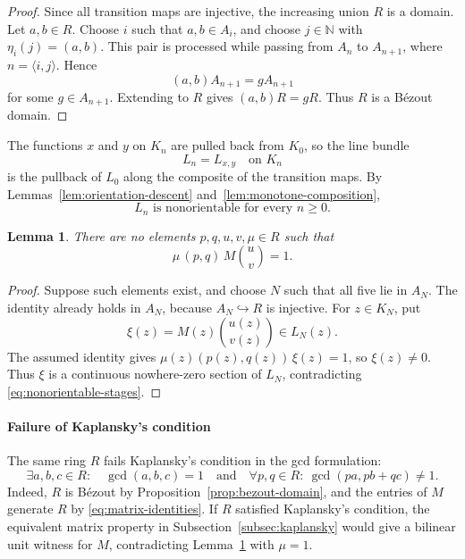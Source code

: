 \documentclass[11pt]{amsart}
\numberwithin{equation}{section}
\newtheorem{lemma}[theorem]{Lemma}
\theoremstyle{definition}
\newcommand{\N}{\mathbb{N}}
\begin{document}
\begin{proof}
Since all transition maps are injective, the increasing union $R$ is a domain. Let $a,b\in R$. Choose $i$ such that $a,b\in A_i$, and choose $j\in\N$ with $\eta_i(j)=(a,b)$. This pair is processed while passing from $A_n$ to $A_{n+1}$, where $n=\langle i,j\rangle$. Hence
\[
  (a,b)A_{n+1}=gA_{n+1}
\]
for some $g\in A_{n+1}$. Extending to $R$ gives $(a,b)R=gR$. Thus $R$ is a B\'ezout domain.
\end{proof}

The functions $x$ and $y$ on $K_n$ are pulled back from $K_0$, so the line bundle
\[
  L_n=L_{x,y}\quad\text{on }K_n
\]
is the pullback of $L_0$ along the composite of the transition maps. By Lemmas~\ref{lem:orientation-descent} and~\ref{lem:monotone-composition},
\begin{equation}\label{eq:nonorientable-stages}
  L_n\text{ is nonorientable for every }n\ge0.
\end{equation}

\begin{lemma}\label{lem:key-obstruction}
There are no elements $p,q,u,v,\mu\in R$ such that
\[
  \mu\,(p,q)\,M\binom uv=1.
\]
\end{lemma}

\begin{proof}
Suppose such elements exist, and choose $N$ such that all five lie in $A_N$. The identity already holds in $A_N$, because $A_N\hookrightarrow R$ is injective. For $z\in K_N$, put
\[
  \xi(z)=M(z)\binom{u(z)}{v(z)}\in L_N(z).
\]
The assumed identity gives $\mu(z)(p(z),q(z))\,\xi(z)=1$, so $\xi(z)\ne0$. Thus $\xi$ is a continuous nowhere-zero section of $L_N$, contradicting \eqref{eq:nonorientable-stages}.
\end{proof}

\paragraph{Failure of Kaplansky's condition}
The same ring $R$ fails Kaplansky's condition in the gcd formulation:
\[
  \exists a,b,c\in R:\quad \gcd(a,b,c)=1
  \quad\text{and}\quad
  \forall p,q\in R:\ \gcd(pa,pb+qc)\ne1.
\]
Indeed, $R$ is B\'ezout by Proposition~\ref{prop:bezout-domain}, and the entries of $M$ generate $R$ by \eqref{eq:matrix-identities}. If $R$ satisfied Kaplansky's condition, the equivalent matrix property in Subsection~\ref{subsec:kaplansky} would give a bilinear unit witness for $M$, contradicting Lemma~\ref{lem:key-obstruction} with $\mu=1$.
\end{document}
